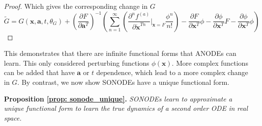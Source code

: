 \documentclass{article}
\theoremstyle{remark}
\theoremstyle{definition}
\begin{document}
\begin{proof}
Which gives the corresponding change in $G$
\begin{equation}
\label{eqn: g_gauge_change}
    \tilde{G} = G(\mathbf{x},\mathbf{a}, t, \theta_{G}) +
    \left(
    \frac{\partial F}{\partial \mathbf{a}^{T}}
    \right)^{-1}
    \left(
    \sum_{n=1}^{\infty}
    \left(
    \frac{\partial ^{n}f^{(a)}}{\partial \dot{\mathbf{x}}^{Tn}}\Biggr\vert_{\dot{\mathbf{x}}=F}\frac{\phi^{n}}{n!}
    \right)
    -\frac{\partial F}{\partial \mathbf{x}^{T}}\phi
    -\frac{\partial \phi}{\partial \mathbf{x}^{T}}F
    -\frac{\partial \phi}{\partial \mathbf{x}^{T}}\phi
    \right)
\end{equation}
\end{proof}

This demonstrates that there are infinite functional forms that ANODEs can learn. This only considered perturbing functions $\phi(\mathbf{x})$. More complex functions can be added that have $\mathbf{a}$ or $t$ dependence, which lead to a more complex change in $G$. By contrast, we now show SONODEs have a unique functional form.

\textbf{Proposition \ref{prop: sonode_unique}.} \textit{SONODEs learn to approximate a unique functional form to learn the true dynamics of a second order ODE in real space.}
\end{document}
